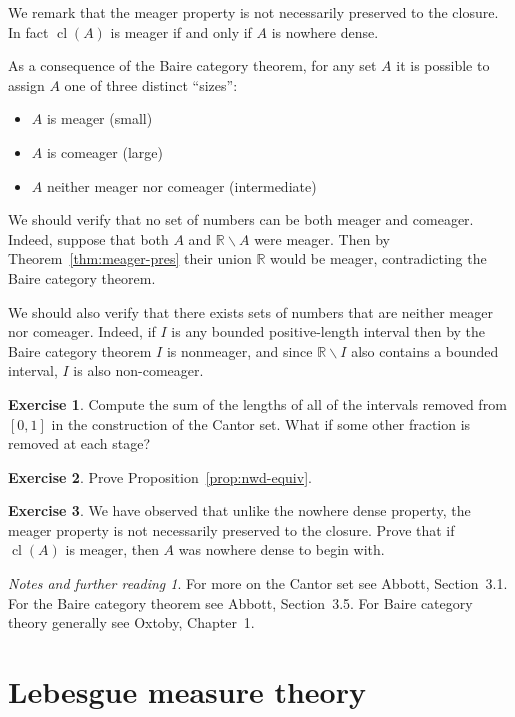 \documentclass[11pt,oneside]{amsbook}
\newcommand{\RR}{\mathbb R}
\DeclareMathOperator{\cl}{cl}
\theoremstyle{definition}
\newtheorem{exerc}{Exercise}[section]
\theoremstyle{plain}
\theoremstyle{definition}
\theoremstyle{remark}
\newtheorem*{notes}{Notes and further reading}
\begin{document}
We remark that the meager property is not necessarily preserved to the closure. In fact $\cl(A)$ is meager if and only if $A$ is nowhere dense.

As a consequence of the Baire category theorem, for any set $A$ it is possible to assign $A$ one of three distinct ``sizes'':
\begin{itemize}
\item $A$ is meager (small)
\item $A$ is comeager (large)
\item $A$ neither meager nor comeager (intermediate)
\end{itemize}
We should verify that no set of numbers can be both meager and comeager. Indeed, suppose that both $A$ and $\RR\smallsetminus A$ were meager. Then by Theorem~\ref{thm:meager-pres} their union $\RR$ would be meager, contradicting the Baire category theorem.

We should also verify that there exists sets of numbers that are neither meager nor comeager. Indeed, if $I$ is any bounded positive-length interval then by the Baire category theorem $I$ is nonmeager, and since $\RR\smallsetminus I$ also contains a bounded interval, $I$ is also non-comeager.

\begin{exerc}
  \label{exerc:cantor}
  Compute the sum of the lengths of all of the intervals removed from $[0,1]$ in the construction of the Cantor set. What if some other fraction is removed at each stage?
\end{exerc}

\begin{exerc}
  \label{exerc:nwd-equiv}
  Prove Proposition~\ref{prop:nwd-equiv}.
\end{exerc}

\begin{exerc}
  We have observed that unlike the nowhere dense property, the meager property is not necessarily preserved to the closure. Prove that if $\cl(A)$ is meager, then $A$ was nowhere dense to begin with.
\end{exerc}

\begin{notes}
  For more on the Cantor set see Abbott, Section~3.1. For the Baire category theorem see Abbott, Section~3.5. For Baire category theory generally see Oxtoby, Chapter~1.
\end{notes}

\section{Lebesgue measure theory}
\end{document}
